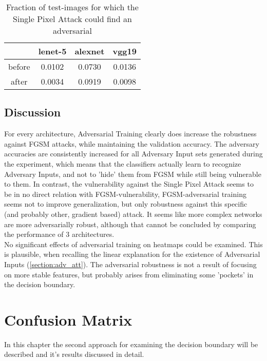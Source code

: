 \documentclass[draft,final]{vutinfth} %
\begin{document}
\begin{table}
	\begin{tabular}{|c|c|c|c|}
		\hline
							& lenet-5 	& alexnet & vgg19\\
		\hline
			before 	& 0.0102 		& 0.0730 	& 0.0136 \\
			after  	& 0.0034 		& 0.0919 	& 0.0098 \\
		\hline
	\end{tabular}
	\caption{Fraction of test-images for which the Single Pixel Attack could find an adversarial}
	\label{tbl:exp:iat:xvul}
\end{table}

\section{Discussion}

For every architecture, Adversarial Training clearly does increase the robustness against FGSM attacks, while maintaining the validation accuracy.
The adversary accuracies are consistently increased for all Adversary Input sets generated during the experiment, which means that the classifiers actually learn to recognize
Adversary Inputs, and not to 'hide' them from FGSM while still being vulnerable to them.
In contrast, the vulnerability against the Single Pixel Attack seems to be in no direct relation with FGSM-vulnerability, FGSM-adversarial training seems not to improve generalization, but only robustness against this specific (and probably other, gradient based) attack.
It seems like more complex networks are more adversarially robust, although that cannot be concluded by comparing the performance of 3 architectures.\\

No significant effects of adversarial training on heatmaps could be examined.
This is plausible, when recalling the linear explanation for the existence of Adversarial Inputs (\ref{section:adv_att}).
The adversarial robustness is not a result of focusing on more stable features, but probably arises from eliminating some 'pockets' in the decision boundary.


\chapter{Confusion Matrix}

In this chapter the second approach for examining the decision boundary will be described and it's results discussed in detail.
\end{document}
